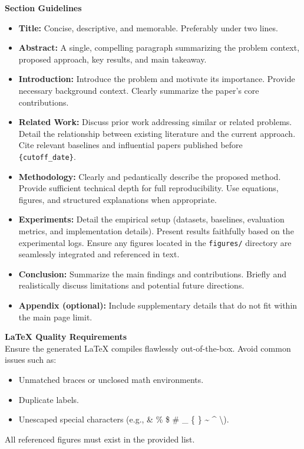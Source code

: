 \vspace{1em}
\noindent\textbf{Section Guidelines}
\begin{itemize}
    \item \textbf{Title:} Concise, descriptive, and memorable. Preferably under two lines.
    \item \textbf{Abstract:} A single, compelling paragraph summarizing the problem context, proposed approach, key results, and main takeaway.
    \item \textbf{Introduction:} Introduce the problem and motivate its importance. Provide necessary background context. Clearly summarize the paper's core contributions.
    \item \textbf{Related Work:} Discuss prior work addressing similar or related problems. Detail the relationship between existing literature and the current approach. Cite relevant baselines and influential papers published before \texttt{\{cutoff\_date\}}.
    \item \textbf{Methodology:} Clearly and pedantically describe the proposed method. Provide sufficient technical depth for full reproducibility. Use equations, figures, and structured explanations when appropriate.
    \item \textbf{Experiments:} Detail the empirical setup (datasets, baselines, evaluation metrics, and implementation details). Present results faithfully based on the experimental logs. Ensure any figures located in the \texttt{figures/} directory are seamlessly integrated and referenced in text.
    \item \textbf{Conclusion:} Summarize the main findings and contributions. Briefly and realistically discuss limitations and potential future directions.
    \item \textbf{Appendix (optional):} Include supplementary details that do not fit within the main page limit.
\end{itemize}

\vspace{1em}
\noindent\textbf{LaTeX Quality Requirements}\\
\vspace{0.5em}
Ensure the generated LaTeX compiles flawlessly out-of-the-box. Avoid common issues such as:
\begin{itemize}
    \item Unmatched braces or unclosed math environments.
    \item Duplicate labels.
    \item Unescaped special characters (e.g., \& \% \$ \# \_ \{ \} \textasciitilde{} \textasciicircum{} \textbackslash{}).
\end{itemize}
All referenced figures must exist in the provided list.

